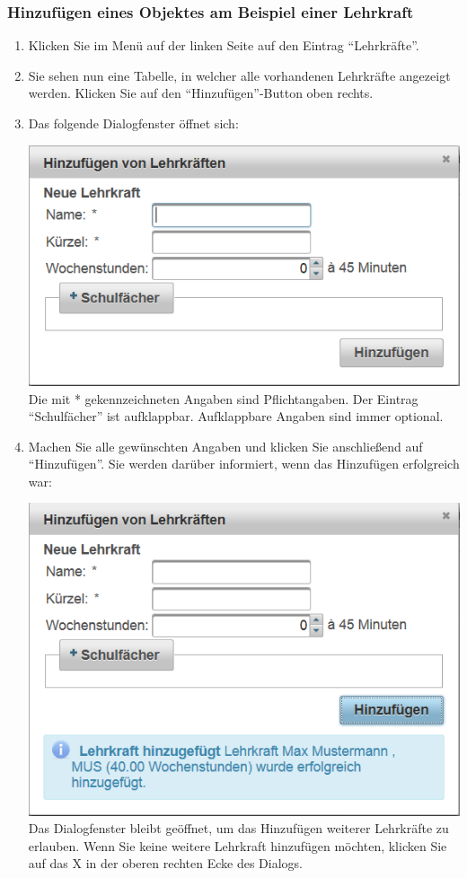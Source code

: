 \documentclass[fontsize=12pt]{scrartcl}
\begin{document}
\subsubsection{Hinzufügen eines Objektes am Beispiel einer Lehrkraft}
\begin{enumerate}
\item Klicken Sie im Menü auf der linken Seite auf den Eintrag "`Lehrkräfte"'.
\item Sie sehen nun eine Tabelle, in welcher alle vorhandenen Lehrkräfte angezeigt werden. Klicken Sie auf den "`Hinzufügen"'-Button oben rechts.
\item Das folgende Dialogfenster öffnet sich: \medskip\\
	\begin{minipage}[t]{\linewidth}
            \includegraphics[width=.8\linewidth]{images/addTeacherDialog.png}
    \medskip\\
    Die mit * gekennzeichneten Angaben sind Pflichtangaben. Der Eintrag "`Schulfächer"' ist aufklappbar. Aufklappbare Angaben sind immer optional.
    \end{minipage}
\clearpage
\item Machen Sie alle gewünschten Angaben und klicken Sie anschließend auf "`Hinzufügen"'. Sie werden darüber informiert, wenn das Hinzufügen erfolgreich war: \medskip\\
	\begin{minipage}[t]{\linewidth}
            \includegraphics[width=.8\linewidth]{images/addedTeacher.png}
    \medskip\\
    Das Dialogfenster bleibt geöffnet, um das Hinzufügen weiterer Lehrkräfte zu erlauben. Wenn Sie keine weitere Lehrkraft hinzufügen möchten, klicken Sie auf das X in der oberen rechten Ecke des Dialogs.
    \end{minipage}
\end{enumerate}
\end{document}
